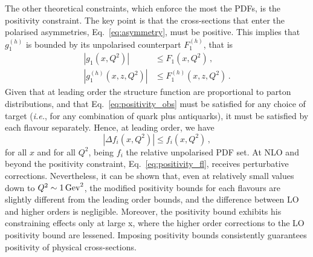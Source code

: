 The other theoretical constraints, which enforce the most the PDFs, is the positivity constraint. The key point is that the cross-sections that enter the polarised asymmetries, Eq.~\eqref{eq:asymmetry}, must be positive. This implies that $g_1^{(h)}$ is bounded by its unpolarised counterpart $F_1^{(h)}$, that is
\begin{equation}
  \begin{split}
    \left| g_1 (x,Q^2)  \right|& \leq F_1(x, Q^2) \,,\\
    \left| g_1^{(h)} (x,z,Q^2)  \right|& \leq F_1^{(h)}(x, z, Q^2) \,.
  \end{split}
  \label{eq:positivity_obs}
\end{equation}
Given that at leading order the structure function are proportional to parton distributions, and that Eq.~\eqref{eq:positivity_obs} must be satisfied for any choice of target (\textit{i.e.}, for any combination of quark plus antiquarks), it must be satisfied by each flavour separately. Hence, at leading order, we have
\begin{equation}
  \left| \Delta f_i (x,Q^2) \right| \leq f_i (x,Q^2) \,,
  \label{eq:positivity_fl}
\end{equation}
for all $x$ and for all $Q^2$, being $f_i$ the relative unpolarised PDF set. At NLO and beyond the positivity constraint, Eq.~\eqref{eq:positivity_fl}, receives perturbative corrections. Nevertheless, it can be shown \cite{Altarelli:1998gn} that, even at relatively small values down to $Q^2 \sim 1 \, \textrm{Gev}^2$, the modified positivity bounds for each flavours are slightly different from the leading order bounds, and the difference between LO and higher orders is negligible. Moreover, the positivity bound exhibits his constraining effects only at large x, where the higher order corrections to the LO positivity bound are lessened. Imposing positivity bounds consistently guarantees positivity of physical cross-sections.%

